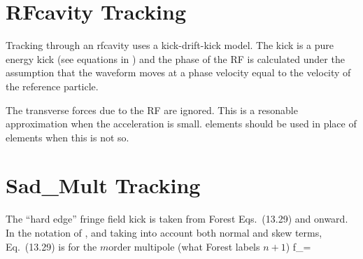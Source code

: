 \section{RFcavity Tracking}
\label{s:rfcavity.std}

Tracking through an rfcavity uses a kick-drift-kick model. The kick is
a pure energy kick (see equations in ) and the phase of
the RF is calculated under the assumption that the waveform moves at a
phase velocity equal to the velocity of the reference particle.

The transverse forces due to the RF are ignored. This is a resonable
approximation when the acceleration is small.  elements
should be used in place of  elements when this is not so.

\section{Sad\_Mult Tracking}
\label{s:sad.mult.std}

The ``hard edge'' fringe field kick is taken from Forest\cite{b:forest} Eqs.~(13.29) and onward.
In the notation of \bmad, and taking into account both normal and skew terms, Eq.~(13.29)
is for the $m$\th order multipole (what Forest labels $n+1$)
\Begineq
  f_\pm = \mp \Re {}
\Endeq

